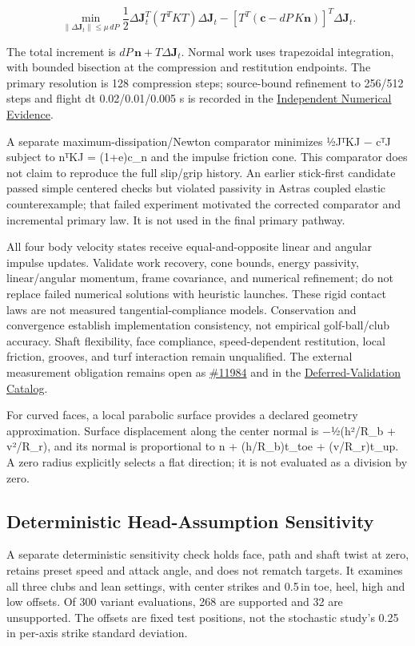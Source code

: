 \documentclass[
]{article}
\begin{document}
\[\min_{\|\Delta\mathbf J_t\|\leq\mu\,dP}
\frac12\Delta\mathbf J_t^T(T^TKT)\Delta\mathbf J_t
-\left[T^T(\mathbf c-dP\,K\mathbf n)\right]^T\Delta\mathbf J_t.\]

The total increment is \(dP\,\mathbf n+T\Delta\mathbf J_t\). Normal work
uses trapezoidal integration, with bounded bisection at the compression
and restitution endpoints. The primary resolution is 128 compression
steps; source-bound refinement to 256/512 steps and flight dt
0.02/0.01/0.005 s is recorded in the
\href{validation/independent_preflight_summary.json}{Independent
Numerical Evidence}.

A separate maximum-dissipation/Newton comparator minimizes ½JᵀKJ − cᵀJ
subject to nᵀKJ = (1+e)c\_n and the impulse friction cone. This
comparator does not claim to reproduce the full slip/grip history. An
earlier stick-first candidate passed simple centered checks but violated
passivity in Astra\textquotesingle s coupled elastic counterexample;
that failed experiment motivated the corrected comparator and
incremental primary law. It is not used in the final primary pathway.

All four body velocity states receive equal-and-opposite linear and
angular impulse updates. Validate work recovery, cone bounds, energy
passivity, linear/angular momentum, frame covariance, and numerical
refinement; do not replace failed numerical solutions with heuristic
launches. These rigid contact laws are not measured
tangential-compliance models. Conservation and convergence establish
implementation consistency, not empirical golf-ball/club accuracy. Shaft
flexibility, face compliance, speed-dependent restitution, local
friction, grooves, and turf interaction remain unqualified. The external
measurement obligation remains open as
\href{https://github.com/D-sorganization/UpstreamDrift/issues/11984}{\#11984}
and in the
\href{../../../development/planning/DV-11984.md}{Deferred-Validation
Catalog}.

For curved faces, a local parabolic surface provides a declared geometry
approximation. Surface displacement along the center normal is
−½(h²/R\_b + v²/R\_r), and its normal is proportional to n +
(h/R\_b)t\_toe + (v/R\_r)t\_up. A zero radius explicitly selects a flat
direction; it is not evaluated as a division by zero.

\subsection{Deterministic Head-Assumption Sensitivity}
A separate deterministic sensitivity check holds face, path and shaft twist at
zero, retains preset speed and attack angle, and does not rematch targets.
It examines all three clubs and lean settings, with center strikes and
0.5\,in toe, heel, high and low offsets. Of 300 variant evaluations, 268 are
supported and 32 are unsupported. The offsets are fixed test positions,
not the stochastic study's 0.25\,in per-axis strike standard deviation.
\end{document}
